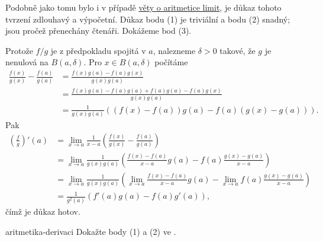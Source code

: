 \begin{thmproof}
 Podobně jako tomu bylo i v případě \hyperref[thm:aritmetika-limit]{věty o
 aritmetice limit}, je důkaz tohoto tvrzení zdlouhavý a výpočetní. Důkaz bodu
 (1) je triviální a bodu (2) snadný; jsou pročež přenechány čtenáři. Dokážeme
 bod (3).

 Protože $f / g$ je z předpokladu spojitá v $a$, nalezneme $\delta>0$ takové, že
 $g$ je nenulová na $B(a,\delta)$. Pro $x \in B(a,\delta)$ počítáme
 \begin{align*}
  \frac{f(x)}{g(x)} - \frac{f(a)}{g(a)} &= \frac{f(x)g(a) -
  f(a)g(x)}{g(x)g(a)}\\
                                        &= \frac{f(x)g(a) - f(a)g(a) + f(a)g(a)
                                        - f(a)g(x)}{g(x)g(a)}\\
                                        &= \frac{1}{g(x)g(a)}\left( (f(x) -
                                        f(a))g(a) - f(a)(g(x) - g(a)) \right).
 \end{align*}
 Pak
 \begin{align*}
  \left( \frac{f}{g} \right)'(a) &= \lim_{x \to a} \frac{1}{x-a}\left(
  \frac{f(x)}{g(x)} - \frac{f(a)}{g(a)} \right)\\
                                 &= \lim_{x \to a} \frac{1}{g(x)g(a)}\left(
                                 \frac{f(x) - f(a)}{x-a}g(a) - f(a) \frac{g(x) -
                                g(a)}{x-a} \right)\\
                                 &= \lim_{x \to a} \frac{1}{g(x)g(a)}\left(
                                 \lim_{x \to a} \frac{f(x) - f(a)}{x-a}g(a) -
                                \lim_{x \to a} f(a) \frac{g(x) - g(a)}{x-a}
                               \right)\\
                                 &= \frac{1}{g^2(a)}\left( f'(a)g(a) - f(a)g'(a)
                                 \right),
 \end{align*}
 čímž je důkaz hotov.
\end{thmproof}

\begin{exercise}{}{aritmetika-derivaci}
 Dokažte body (1) a (2) ve .
\end{exercise}


